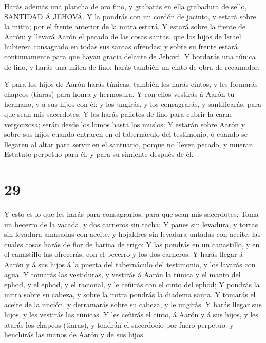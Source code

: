  Harás además una plancha de oro fino, y grabarás en ella
grabadura de sello, SANTIDAD Á JEHOVÁ.  Y la pondrás con un
cordón de jacinto, y estará sobre la mitra; por el frente anterior de la
mitra estará.  Y estará sobre la frente de Aarón: y llevará
Aarón el pecado de las cosas santas, que los hijos de Israel hubieren
consagrado en todas sus santas ofrendas; y sobre su frente estará
continuamente para que hayan gracia delante de Jehová.  Y
bordarás una túnica de lino, y harás una mitra de lino; harás también un
cinto de obra de recamador.

 Y para los hijos de Aarón harás túnicas; también les harás
cintos, y les formarás chapeos (tiaras) para honra y hermosura.
 Y con ellos vestirás á Aarón tu hermano, y á sus hijos con
él: y los ungirás, y los consagrarás, y santificarás, para que sean mis
sacerdotes.  Y les harás pañetes de lino para cubrir la
carne vergonzosa; serán desde los lomos hasta los muslos: 
Y estarán sobre Aarón y sobre sus hijos cuando entraren en el
tabernáculo del testimonio, ó cuando se llegaren al altar para servir en
el santuario, porque no lleven pecado, y mueran. Estatuto perpetuo para
él, y para su simiente después de él.

\hypertarget{section-28}{%
\section{29}\label{section-28}}

 Y esto es lo que les harás para consagrarlos, para que sean
mis sacerdotes: Toma un becerro de la vacada, y dos carneros sin tacha;
 Y panes sin levadura, y tortas sin levadura amasadas con
aceite, y hojaldres sin levadura untadas con aceite; las cuales cosas
harás de flor de harina de trigo:  Y las pondrás en un
canastillo, y en el canastillo las ofrecerás, con el becerro y los dos
carneros.  Y harás llegar á Aarón y á sus hijos á la puerta
del tabernáculo del testimonio, y los lavarás con agua.  Y
tomarás las vestiduras, y vestirás á Aarón la túnica y el manto del
ephod, y el ephod, y el racional, y le ceñirás con el cinto del ephod;
 Y pondrás la mitra sobre su cabeza, y sobre la mitra
pondrás la diadema santa.  Y tomarás el aceite de la unción,
y derramarás sobre su cabeza, y le ungirás.  Y harás llegar
sus hijos, y les vestirás las túnicas.  Y les ceñirás el
cinto, á Aarón y á sus hijos, y les atarás los chapeos (tiaras), y
tendrán el sacerdocio por fuero perpetuo: y henchirás las manos de Aarón
y de sus hijos.

